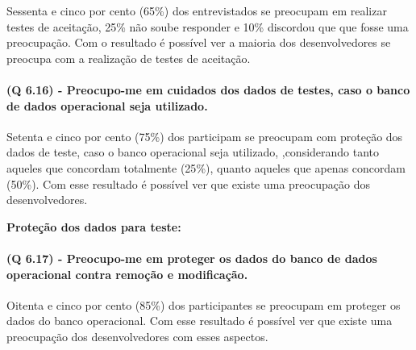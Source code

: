 Sessenta e cinco por cento (65{\%}) dos entrevistados se preocupam em realizar testes de aceitação, 25{\%} não soube responder e 10{\%} discordou que que fosse uma preocupação. Com o resultado é possível ver a maioria dos desenvolvedores se preocupa com a realização de testes de aceitação.

\paragraph{\textbf{(Q 6.16)} - Preocupo-me em cuidados dos dados de testes, caso o banco de dados operacional seja utilizado.}

Setenta e cinco por cento (75{\%}) dos participam se preocupam com proteção dos dados de teste, caso o banco operacional seja utilizado, ,considerando tanto aqueles que concordam totalmente (25{\%}), quanto aqueles que apenas concordam (50{\%}).  Com esse resultado é possível ver que existe uma preocupação dos desenvolvedores.

\vspace{0.5cm}
\noindent\textbf{Proteção dos dados para teste:}
\paragraph{\textbf{(Q 6.17)} - Preocupo-me em proteger os dados do banco de dados operacional contra remoção e modificação.}

Oitenta e cinco por cento (85{\%}) dos participantes se preocupam em proteger os dados do banco operacional. Com esse resultado é possível ver que existe uma preocupação dos desenvolvedores com esses aspectos.